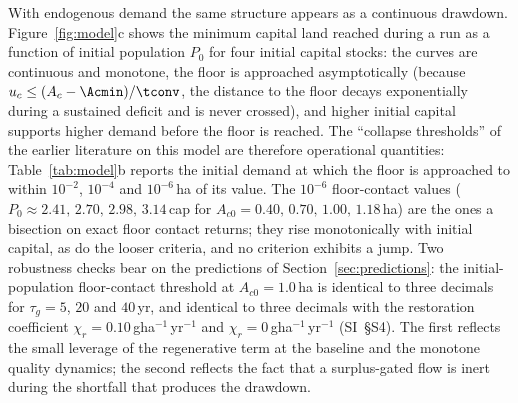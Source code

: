 With endogenous demand the same structure appears as a continuous drawdown. Figure~\ref{fig:model}c shows the minimum capital land reached during a run as a function of initial population $P_0$ for four initial capital stocks: the curves are continuous and monotone, the floor is approached asymptotically (because $u_c\le(A_c-\Acmin)/\tconv$, the distance to the floor decays exponentially during a sustained deficit and is never crossed), and higher initial capital supports higher demand before the floor is reached. The ``collapse thresholds'' of the earlier literature on this model are therefore operational quantities: Table~\ref{tab:model}b reports the initial demand at which the floor is approached to within $10^{-2}$, $10^{-4}$ and $10^{-6}$\,ha of its value. The $10^{-6}$ floor-contact values ($P_0\approx2.41,\,2.70,\,2.98,\,3.14$\,cap for $A_{c0}=0.40,\,0.70,\,1.00,\,1.18$\,ha) are the ones a bisection on exact floor contact returns; they rise monotonically with initial capital, as do the looser criteria, and no criterion exhibits a jump. Two robustness checks bear on the predictions of Section~\ref{sec:predictions}: the initial-population floor-contact threshold at $A_{c0}=1.0$\,ha is identical to three decimals for $\tau_g=5$, $20$ and $40$\,yr, and identical to three decimals with the restoration coefficient $\chi_r=0.10$\,gha$^{-1}$\,yr$^{-1}$ and $\chi_r=0$\,gha$^{-1}$\,yr$^{-1}$ (SI~\S S4). The first reflects the small leverage of the regenerative term at the baseline and the monotone quality dynamics; the second reflects the fact that a surplus-gated flow is inert during the shortfall that produces the drawdown.

